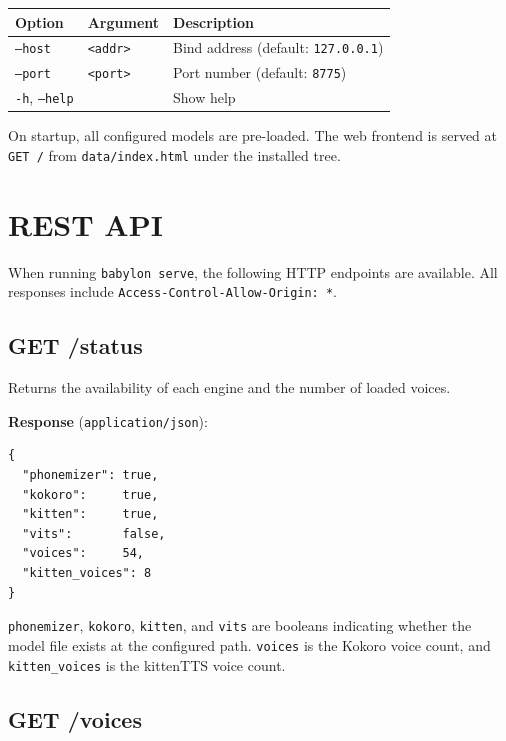 \documentclass[12pt,a4paper]{article}
\begin{document}
\begin{center}
\begin{tabular}{lll}
\toprule
\textbf{Option} & \textbf{Argument} & \textbf{Description} \\
\midrule
\texttt{--host} & \texttt{<addr>} & Bind address (default: \texttt{127.0.0.1}) \\
\texttt{--port} & \texttt{<port>} & Port number (default: \texttt{8775}) \\
\texttt{-h}, \texttt{--help} & & Show help \\
\bottomrule
\end{tabular}
\end{center}

On startup, all configured models are pre-loaded. The web frontend is served at \texttt{GET /} from \texttt{data/index.html} under the installed tree.

\section{REST API}
\label{sec:rest}

When running \texttt{babylon serve}, the following HTTP endpoints are available. All responses include \texttt{Access-Control-Allow-Origin: *}.

\subsection{GET /status}

Returns the availability of each engine and the number of loaded voices.

\textbf{Response} (\texttt{application/json}):

\begin{lstlisting}[language={}]
{
  "phonemizer": true,
  "kokoro":     true,
  "kitten":     true,
  "vits":       false,
  "voices":     54,
  "kitten_voices": 8
}
\end{lstlisting}

\texttt{phonemizer}, \texttt{kokoro}, \texttt{kitten}, and \texttt{vits} are booleans indicating whether the model file exists at the configured path. \texttt{voices} is the Kokoro voice count, and \texttt{kitten\_voices} is the kittenTTS voice count.

\subsection{GET /voices}
\end{document}
